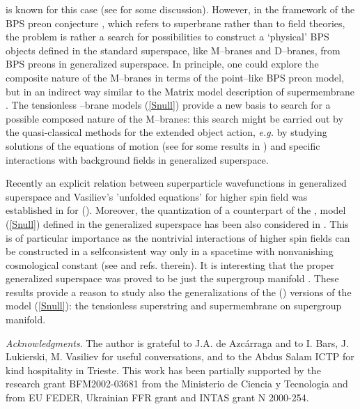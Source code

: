 \documentclass[a4paper,11pt]{article}
\begin{document}
is known for this case (see \cite{BL98'} for some discussion). 
However, in the framework of the BPS preon conjecture \cite{BPS01}, 
which refers to superbrane rather than to field theories, 
the problem is rather a search for possibilities  to construct a  
`physical' BPS objects defined in the standard superspace, 
like M--branes and D--branes, from  BPS preons in generalized superspace. 
In principle, one could explore the composite nature of the M--branes in terms
of the    point--like BPS preon model,  but in an indirect way 
similar to the Matrix model description of supermembrane  \cite{MT}. 
The tensionless \coordHE{}--brane models (\ref{Snull}) provide a new basis to 
search for a possible composed nature of the M--branes: 
this search might be carried out by the quasi-classical methods 
for the extended object action, {\it e.g.} by studying solutions of 
the  equations of motion (see \cite{ZL} for some results in \coordHE{}) 
and specific interactions with background fields in generalized superspace.

Recently an explicit relation between superparticle wavefunctions 
in generalized superspace and  Vasiliev's 'unfolded equations' 
for higher spin field was established in \cite{Dima} for \coordHE{} (\coordHE{}). 
Moreover, the quantization  
of a counterpart of the \coordHE{}, \coordHE{} model (\ref{Snull})  
defined in the generalized \coordHE{} superspace 
has been also considered in \cite{Dima}. 
This is of particular importance as the nontrivial interactions 
of higher spin fields can be constructed in a selfconsistent way 
only in a spacetime with nonvanishing cosmological constant 
(see \cite{Vasiliev89} and refs. therein).
It is interesting that the proper generalized \coordHE{} superspace 
was proved to be just the supergroup manifold \coordHE{} \cite{Dima,Misha}. 
These results provide a reason to study also 
the \coordHE{} generalizations of the \coordHE{} (\coordHE{}) 
versions of the model (\ref{Snull}): the 
tensionless superstring and supermembrane on  \coordHE{} supergroup manifold. 




\bigskip  



{\it Acknowledgments}. 
The author  is grateful to J.A. de Azc\'arraga and to I. Bars, 
J. Lukierski, M. Vasiliev for useful  
conversations, and to  
the Abdus Salam ICTP for kind hospitality 
in Trieste.  This work has been partially supported by 
the research grant BFM2002-03681 from the Ministerio de Ciencia y 
Tecnologia and from EU FEDER, Ukrainian FFR grant 
\coordHE{} and INTAS grant N 2000-254. 
\end{document}
